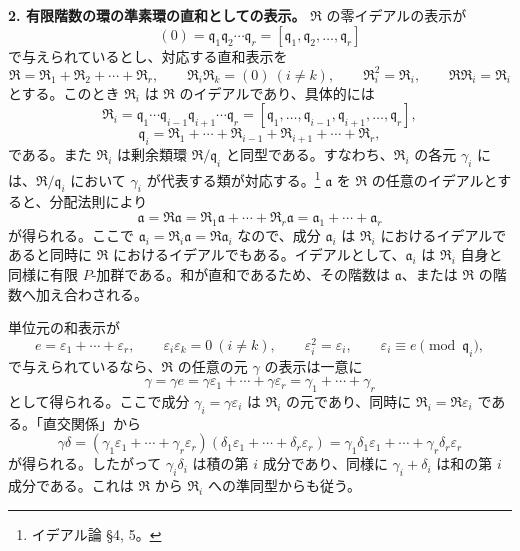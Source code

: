 \documentclass[11pt]{article}
\begin{document}
\textbf{2. 有限階数の環の準素環の直和としての表示。} $\mathfrak R$ の零イデアルの表示が
\[
   (0)=\mathfrak q_1\mathfrak q_2\cdots\mathfrak q_r
       =[\mathfrak q_1,\mathfrak q_2,\ldots,\mathfrak q_r]
\]
で与えられているとし、対応する直和表示を
\[
   \mathfrak R=\mathfrak R_1+\mathfrak R_2+\cdots+\mathfrak R_r,
   \qquad
   \mathfrak R_i\mathfrak R_k=(0)\ (i\ne k),
   \qquad
   \mathfrak R_i^2=\mathfrak R_i,
   \qquad
   \mathfrak R\mathfrak R_i=\mathfrak R_i
\]
とする。このとき $\mathfrak R_i$ は $\mathfrak R$ のイデアルであり、具体的には
\[
   \mathfrak R_i
   =\mathfrak q_1\cdots\mathfrak q_{i-1}\mathfrak q_{i+1}\cdots\mathfrak q_r
   =[\mathfrak q_1,\ldots,\mathfrak q_{i-1},\mathfrak q_{i+1},\ldots,\mathfrak q_r],
\]
\[
   \mathfrak q_i=\mathfrak R_1+\cdots+\mathfrak R_{i-1}+\mathfrak R_{i+1}+\cdots+\mathfrak R_r,
\]
である。また $\mathfrak R_i$ は剰余類環 $\mathfrak R/\mathfrak q_i$ と同型である。すなわち、$\mathfrak R_i$ の各元 $\gamma_i$ には、$\mathfrak R/\mathfrak q_i$ において $\gamma_i$ が代表する類が対応する。\footnote{イデアル論 \S 4, 5。} $\mathfrak a$ を $\mathfrak R$ の任意のイデアルとすると、分配法則により
\[
   \mathfrak a=\mathfrak R\mathfrak a
   =\mathfrak R_1\mathfrak a+\cdots+\mathfrak R_r\mathfrak a
   =\mathfrak a_1+\cdots+\mathfrak a_r
\]
が得られる。ここで $\mathfrak a_i=\mathfrak R_i\mathfrak a=\mathfrak R\mathfrak a_i$ なので、成分 $\mathfrak a_i$ は $\mathfrak R_i$ におけるイデアルであると同時に $\mathfrak R$ におけるイデアルでもある。イデアルとして、$\mathfrak a_i$ は $\mathfrak R_i$ 自身と同様に有限 $P$-加群である。和が直和であるため、その階数は $\mathfrak a$、または $\mathfrak R$ の階数へ加え合わされる。

単位元の和表示が
\[
   e=\varepsilon_1+\cdots+\varepsilon_r,
   \qquad
   \varepsilon_i\varepsilon_k=0\ (i\ne k),
   \qquad
   \varepsilon_i^2=\varepsilon_i,
   \qquad
   \varepsilon_i\equiv e\pmod{\mathfrak q_i},
\]
で与えられているなら、$\mathfrak R$ の任意の元 $\gamma$ の表示は一意に
\[
   \gamma=\gamma e=\gamma\varepsilon_1+\cdots+\gamma\varepsilon_r
   =\gamma_1+\cdots+\gamma_r
\]
として得られる。ここで成分 $\gamma_i=\gamma\varepsilon_i$ は $\mathfrak R_i$ の元であり、同時に $\mathfrak R_i=\mathfrak R\varepsilon_i$ である。「直交関係」から
\[
   \gamma\delta=(\gamma_1\varepsilon_1+\cdots+\gamma_r\varepsilon_r)
      (\delta_1\varepsilon_1+\cdots+\delta_r\varepsilon_r)
   =\gamma_1\delta_1\varepsilon_1+\cdots+\gamma_r\delta_r\varepsilon_r
\]
が得られる。したがって $\gamma_i\delta_i$ は積の第 $i$ 成分であり、同様に $\gamma_i+\delta_i$ は和の第 $i$ 成分である。これは $\mathfrak R$ から $\mathfrak R_i$ への準同型からも従う。
\end{document}
